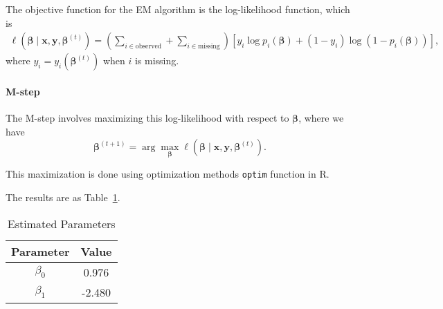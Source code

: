 \documentclass{article}
\begin{document}
The objective function for the EM algorithm is the log-likelihood function, which is
\begin{align*}
\ell(\boldsymbol{\beta} \mid \mathbf{x}, \mathbf{y}, \boldsymbol{\beta}^{(t)}) = \left(\sum_{i \in \text{observed}} + \sum_{i \in \text{missing}}\right) \left[ y_i \log p_i(\boldsymbol{\beta}) + (1 - y_i) \log (1 - p_i(\boldsymbol{\beta})) \right],
\end{align*}
where $y_i = y_i(\boldsymbol{\beta}^{(t)})$ when \( i \) is missing.

\paragraph{M-step}
The M-step involves maximizing this log-likelihood with respect to \( \boldsymbol{\beta} \), where we have
\[
\boldsymbol{\beta}^{(t+1)} = \arg \max_{\boldsymbol{\beta}} \ell(\boldsymbol{\beta} \mid \mathbf{x}, \mathbf{y}, \boldsymbol{\beta}^{(t)}).
\]

This maximization is done using optimization methods \texttt{optim} function in R.

The results are as Table~\ref{tab:q5}.
\begin{table}[h]
\centering
\caption{Estimated Parameters}
\label{tab:q5}
\vspace{0.2cm}
\begin{tabular}{cc}
\toprule
Parameter & Value \\
\midrule
$\beta_0$ & 0.976 \\
$\beta_1$ & -2.480 \\
\bottomrule
\end{tabular}
\end{table}
\end{document}
